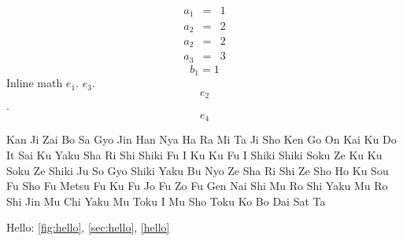 \documentclass{article}
\begin{document}
\begin{eqnarray*}
  a_1&=&1 \label{eq:gamma}\\
  a_2&=&2 \label{sec:gamma}\\
  a_2&=&2 \label{fig:gamma}\\
  a_3&=&3 \label{gamma}
\end{eqnarray*}
\begin{equation*}
  b_1=1 \label{sec:delta}
\end{equation*}
Inline math
$e_1 \label{eq:epsilon1}$.
\(e_3 \label{eq:epsilon3}\).
$$e_2 \label{eq:epsilon2}$$.
\[e_4 \label{eq:epsilon4}\]

\newpage

Kan Ji Zai Bo Sa Gyo Jin Han Nya Ha Ra Mi Ta Ji
Sho Ken Go On Kai Ku Do It Sai Ku Yaku
Sha Ri Shi Shiki Fu I Ku Ku Fu I Shiki Shiki Soku Ze Ku Ku Soku Ze Shiki
Ju So Gyo Shiki Yaku Bu Nyo Ze
Sha Ri Shi Ze Sho Ho Ku Sou Fu Sho Fu Metsu Fu Ku Fu Jo Fu Zo Fu Gen
Nai Shi Mu Ro Shi Yaku Mu Ro Shi Jin Mu Chi Yaku Mu Toku I Mu Sho Toku Ko Bo Dai Sat Ta

Hello: \ref{fig:hello}, \ref{sec:hello}, \ref{hello}
\end{document}
